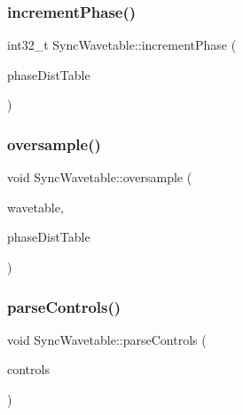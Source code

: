 \mbox{\label{class_sync_wavetable_a3d20e97e3f3bdb31a3aff5125b1db858}} 
\subsubsection{\texorpdfstring{increment\+Phase()}{incrementPhase()}}
{\footnotesize\ttfamily int32\+\_\+t Sync\+Wavetable\+::increment\+Phase (\begin{DoxyParamCaption}\item[{uint32\+\_\+t $\ast$}]{phase\+Dist\+Table }\end{DoxyParamCaption})\hspace{0.3cm}{\ttfamily [inline]}}

\mbox{\label{class_sync_wavetable_a1407a6089d1985273af939fefdb52648}} 
\subsubsection{\texorpdfstring{oversample()}{oversample()}}
{\footnotesize\ttfamily void Sync\+Wavetable\+::oversample (\begin{DoxyParamCaption}\item[{uint32\+\_\+t $\ast$}]{wavetable,  }\item[{uint32\+\_\+t $\ast$}]{phase\+Dist\+Table }\end{DoxyParamCaption})}

\mbox{\label{class_sync_wavetable_a93a65d5450f25e2bf840a5a3f5a7b429}} 
\subsubsection{\texorpdfstring{parse\+Controls()}{parseControls()}}
{\footnotesize\ttfamily void Sync\+Wavetable\+::parse\+Controls (\begin{DoxyParamCaption}\item[{\mbox{\hyperlink{class_via_controls}{Via\+Controls}} $\ast$}]{controls }\end{DoxyParamCaption})}

